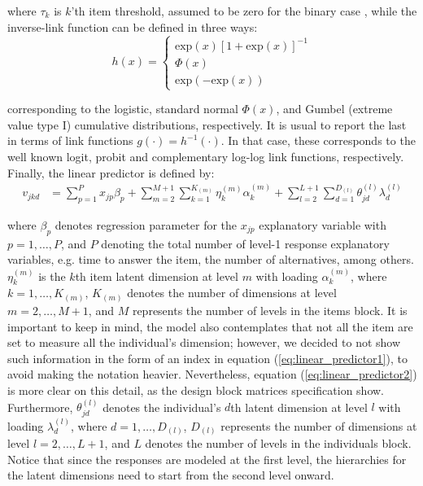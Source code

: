\noindent where $\tau_{k}$ is $k$'th item threshold, assumed to be zero for the binary case \cite{Rabe_et_al_2004a}, while the inverse-link function can be defined in three ways:
%
\begin{equation} \label{eq:response_dich1}
	h(x) = 
	\begin{cases}
		\text{exp}(x)[1 + \text{exp}(x)]^{-1} \\
		\Phi(x)  \\
		\text{exp}(-\text{exp}(x))
	\end{cases}
\end{equation}

\noindent corresponding to the logistic, standard normal $\Phi(x)$, and Gumbel (extreme value type I) cumulative distributions, respectively. It is usual to report the last in terms of link functions $g(\cdot) = h^{-1}(\cdot)$. In that case, these corresponds to the well known logit, probit and complementary log-log link functions, respectively. Finally, the linear predictor is defined by:
%
\begin{equation} \label{eq:linear_predictor1}
	\begin{split}
		v_{jkd} &= \sum_{p=1}^{P} x_{jp} \beta_{p} + \sum_{m=2}^{M+1} \sum_{k=1}^{K_{(m)}} \eta_{k}^{(m)} \alpha_{k}^{(m)} + \sum_{l=2}^{L+1} \sum_{d=1}^{D_{(l)}} \theta_{jd}^{(l)} \lambda_{d}^{(l)}
	\end{split}
\end{equation}

\noindent where $\beta_{p}$ denotes regression parameter for the $x_{jp}$ explanatory variable with $p=1,\dots, P$, and $P$ denoting the total number of level-1 response explanatory variables, e.g. time to answer the item, the number of alternatives, among others. $\eta_{k}^{(m)}$ is the $k$th item latent dimension at level $m$ with loading $\alpha_{k}^{(m)}$, where $k= 1, \dots, K_{(m)}$, $K_{(m)}$ denotes the number of dimensions at level $m=2,\dots, M+1$, and $M$ represents the number of levels in the items block. It is important to keep in mind, the model also contemplates that not all the item are set to measure all the individual's dimension; however, we decided to not show such information in the form of an index in equation (\ref{eq:linear_predictor1}), to avoid making the notation heavier. Nevertheless, equation (\ref{eq:linear_predictor2}) is more clear on this detail, as the design block matrices specification show. Furthermore, $\theta_{jd}^{(l)}$ denotes the individual's $d$th latent dimension at level $l$ with loading $\lambda_{d}^{(l)}$, where $d=1, \dots, D_{(l)}$, $D_{(l)}$ represents the number of dimensions at level $l=2, \dots, L+1$, and $L$ denotes the number of levels in the individuals block. Notice that since the responses are modeled at the first level, the hierarchies for the latent dimensions need to start from the second level onward.

